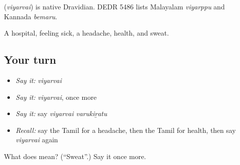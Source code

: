 \begin{cousinweb}
\textbf{} (\emph{viyarvai}) is native Dravidian. DEDR 5486 lists Malayalam \emph{viyarppu} and Kannada \emph{bemaru}.
\end{cousinweb}

\begin{grammarlens}[title={What you've built}]
A hospital, feeling sick, a headache, health, and sweat.
\end{grammarlens}

\subsection*{Your turn}
\begin{itemize}
\raggedright
  \item \emph{Say it:} \emph{viyarvai}
  \item \emph{Say it:} \emph{viyarvai}, once more
  \item \emph{Say it:} say \emph{viyarvai varukiṟatu}
  \item \emph{Recall:} say the Tamil for a headache, then the Tamil for health, then say \emph{viyarvai} again
\end{itemize}

\begin{tcolorbox}[breakable,colback=teal!4,colframe=teal!35!black,title={Before you move on}]
What does  mean? (\textquotedblleft{}Sweat\textquotedblright{}.) Say it once more.
\end{tcolorbox}
